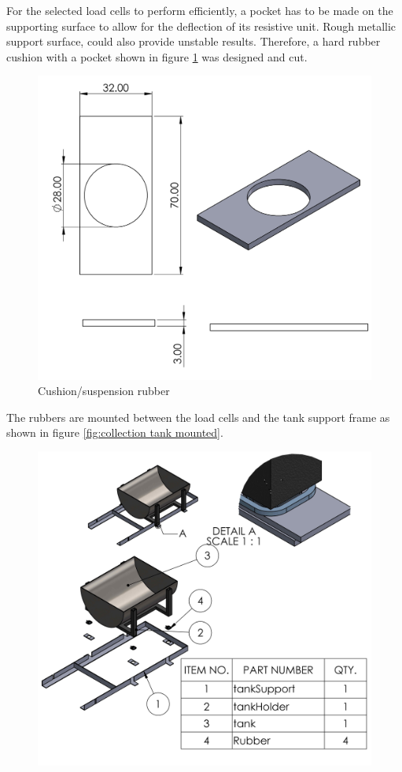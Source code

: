 \begin{itemize}
 For the selected load cells to perform efficiently, a pocket has to be made on the supporting surface to allow for the deflection of its resistive unit. Rough metallic support surface, could also provide unstable results. Therefore, a hard rubber cushion with a pocket shown in figure \ref{fig:cushion_rubber}  was designed and cut.
         \begin{figure}[H]
             \centering
             \includegraphics[width=.45\textwidth]{Figures/Rubber.JPG}
             \caption{Cushion/suspension rubber}
             \label{fig:cushion_rubber}
         \end{figure}
The rubbers are mounted between the load cells and the tank support frame as shown in figure \ref{fig:collection tank mounted}.
\begin{figure}[H]
    \centering
    \includegraphics{Figures/CollectiontankWithSupports.JPG}

\end{figure}
\end{itemize}
